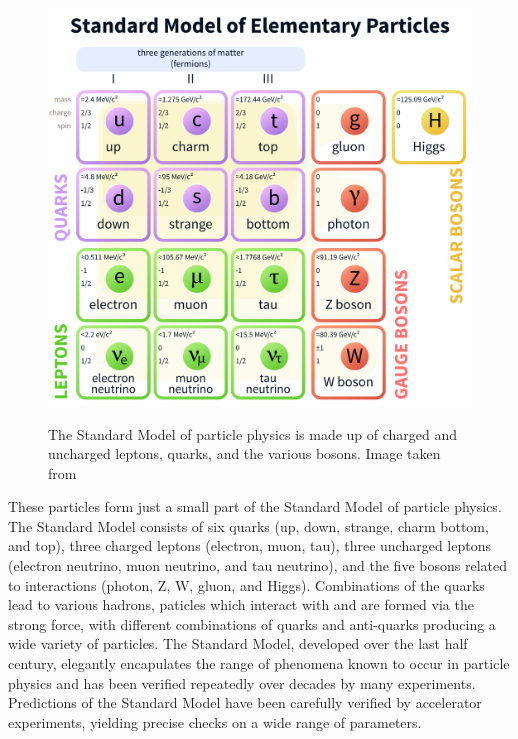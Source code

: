\begin{figure}
\centering
\includegraphics[width=0.9\linewidth]{Standard_Model_of_Elementary_Particles.png}
\label{fig:standard_model}
\caption{The Standard Model of particle physics is made up of charged and uncharged leptons, quarks, and the various bosons. Image taken from \cite{StandardModel-Image}}
\end{figure}

These particles form just a small part of the Standard Model of particle physics.
The Standard Model consists of six quarks (up, down, strange, charm bottom, and top), three charged leptons (electron, muon, tau), three uncharged leptons (electron neutrino, muon neutrino, and tau neutrino), and the five bosons related to interactions (photon, Z, W, gluon, and Higgs).
Combinations of the quarks lead to various hadrons, paticles which interact with and are formed via the strong force, with different combinations of quarks and anti-quarks producing a wide variety of particles.
The Standard Model, developed over the last half century, elegantly encapulates the range of phenomena known to occur in particle physics and has been verified repeatedly over decades by many experiments.
Predictions of the Standard Model have been carefully verified by accelerator experiments, yielding precise checks on a wide range of parameters.

